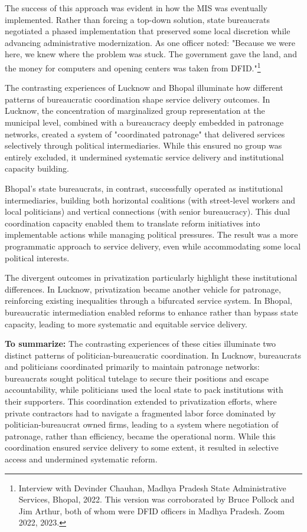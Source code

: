 The success of this approach was evident in how the MIS was eventually implemented. Rather than forcing a top-down solution, state bureaucrats negotiated a phased implementation that preserved some local discretion while advancing administrative modernization. As one officer noted: "Because we were here, we knew where the problem was stuck. The government gave the land, and the money for computers and opening centers was taken from DFID."\footnote{Interview with Devinder Chauhan, Madhya Pradesh State Administrative Services, Bhopal, 2022. This version was corroborated by Bruce Pollock and Jim Arthur, both of whom were DFID officers in Madhya Pradesh. Zoom 2022, 2023.
}


The contrasting experiences of Lucknow and Bhopal illuminate how different patterns of bureaucratic coordination shape service delivery outcomes. In Lucknow, the concentration of marginalized group representation at the municipal level, combined with a bureaucracy deeply embedded in patronage networks, created a system of "coordinated patronage" that delivered services selectively through political intermediaries. While this ensured no group was entirely excluded, it undermined systematic service delivery and institutional capacity building.

Bhopal's state bureaucrats, in contrast, successfully operated as institutional intermediaries, building both horizontal coalitions (with street-level workers and local politicians) and vertical connections (with senior bureaucracy). This dual coordination capacity enabled them to translate reform initiatives into implementable actions while managing political pressures. The result was a more programmatic approach to service delivery, even while accommodating some local political interests.

The divergent outcomes in privatization particularly highlight these institutional differences. In Lucknow, privatization became another vehicle for patronage, reinforcing existing inequalities through a bifurcated service system. In Bhopal, bureaucratic intermediation enabled reforms to enhance rather than bypass state capacity, leading to more systematic and equitable service delivery.

\textbf{To summarize: }
The contrasting experiences of these cities illuminate two distinct patterns of politician-bureaucratic coordination. In Lucknow, bureaucrats and politicians coordinated primarily to maintain patronage networks: bureaucrats sought political tutelage to secure their positions and escape accountability, while politicians used the local state to pack institutions with their supporters. This coordination extended to privatization efforts, where private contractors had to navigate a fragmented labor force dominated by politician-bureaucrat owned firms, leading to a system where negotiation of patronage, rather than efficiency, became the operational norm. While this coordination ensured service delivery to some extent, it resulted in selective access and undermined systematic reform.

